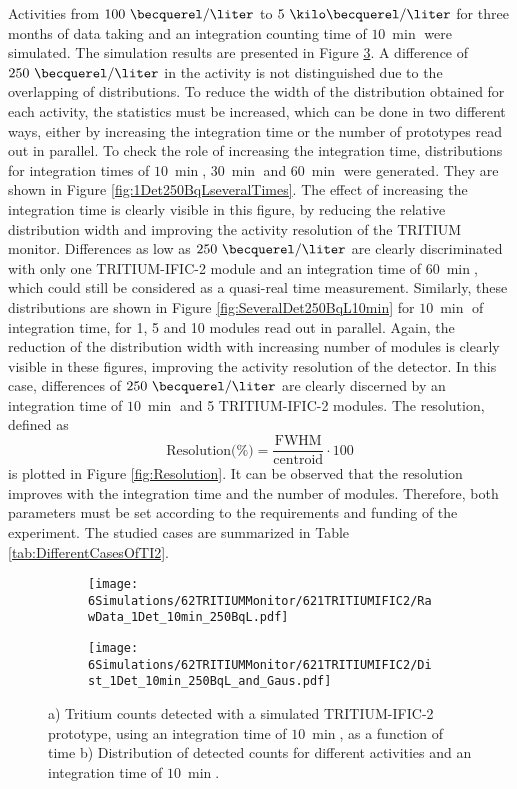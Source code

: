 Activities from $100~\becquerel/\liter$ to $5~\kilo\becquerel/\liter$ for three months of data taking and an integration counting time of $10~\min$ were simulated. The simulation results are presented in Figure \ref{fig:1Det10Min250BqL}. A difference of $250~\becquerel/\liter$ in the activity is not distinguished due to the overlapping of distributions. To reduce the width of the distribution obtained for each activity, the statistics must be increased, which can be done in two different ways, either by increasing the integration time or the number of prototypes read out in parallel. To check the role of increasing the integration time, distributions for integration times of $10~\min$, $30~\min$ and $60~\min$ were generated. They are shown in Figure \ref{fig:1Det250BqLseveralTimes}. The effect of increasing the integration time is clearly visible in this figure, by reducing the relative distribution width and improving the activity resolution of the TRITIUM monitor. Differences as low as $250~\becquerel/\liter$ are clearly discriminated with only one TRITIUM-IFIC-2 module and an integration time of $60~\min$, which could still be considered as a quasi-real time measurement. Similarly, these distributions are shown in Figure \ref{fig:SeveralDet250BqL10min} for $10~\min$ of integration time, for 1, 5 and 10 modules read out in parallel. Again, the reduction of the distribution width with increasing number of modules is clearly visible in these figures, improving the activity resolution of the detector. In this case, differences of $250~\becquerel/\liter$ are clearly discerned by an integration time of $10~\min$ and 5 TRITIUM-IFIC-2 modules. The resolution, defined as
\begin{equation}
\text{Resolution(\%)}=\frac{\text{FWHM}}{\text{centroid}}\cdot{}100
\label{eq:Resolution}
\end{equation}
is plotted in Figure \ref{fig:Resolution}. It can be observed that the resolution improves with the integration time and the number of modules. Therefore, both parameters must be set according to the requirements and funding of the experiment. The studied cases are summarized in Table \ref{tab:DifferentCasesOfTI2}.


\begin{figure}
\centering
    \begin{subfigure}[b]{0.7\textwidth}
    \centering
    \texttt{[image: 6Simulations/62TRITIUMMonitor/621TRITIUMIFIC2/RawData\_1Det\_10min\_250BqL.pdf]}  
    \caption{\label{subfig:RawData1Det10Min250BqL}}
    \end{subfigure}
    \hfill
    \begin{subfigure}[b]{0.7\textwidth}
    \centering
    \texttt{[image: 6Simulations/62TRITIUMMonitor/621TRITIUMIFIC2/Dist\_1Det\_10min\_250BqL\_and\_Gaus.pdf]}  
    \caption{\label{subfig:Dist1Det10Min250BqL}}
    \end{subfigure}
 \caption{a) Tritium counts detected with a simulated TRITIUM-IFIC-2 prototype, using an integration time of $10~\min$, as a function of time b) Distribution of detected counts for different activities and an integration time of $10~\min$.}
 \label{fig:1Det10Min250BqL}
\end{figure}

